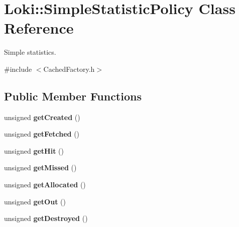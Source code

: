 \hypertarget{classLoki_1_1SimpleStatisticPolicy}{}\section{Loki\+:\+:Simple\+Statistic\+Policy Class Reference}
\label{classLoki_1_1SimpleStatisticPolicy}


Simple statistics.  




{\ttfamily \#include $<$Cached\+Factory.\+h$>$}

\subsection*{Public Member Functions}
\begin{DoxyCompactItemize}
\item 
\hypertarget{classLoki_1_1SimpleStatisticPolicy_a1ea0f0aa571233e43d9f22f576e63fd3}{}unsigned {\bfseries get\+Created} ()\label{classLoki_1_1SimpleStatisticPolicy_a1ea0f0aa571233e43d9f22f576e63fd3}

\item 
\hypertarget{classLoki_1_1SimpleStatisticPolicy_ac1d8f7952cea512cac935f3f0ce8d43d}{}unsigned {\bfseries get\+Fetched} ()\label{classLoki_1_1SimpleStatisticPolicy_ac1d8f7952cea512cac935f3f0ce8d43d}

\item 
\hypertarget{classLoki_1_1SimpleStatisticPolicy_a8708f093b7c911f49de902f7f49c01c4}{}unsigned {\bfseries get\+Hit} ()\label{classLoki_1_1SimpleStatisticPolicy_a8708f093b7c911f49de902f7f49c01c4}

\item 
\hypertarget{classLoki_1_1SimpleStatisticPolicy_a4804bfa6db149775f236c45b30e6d6d7}{}unsigned {\bfseries get\+Missed} ()\label{classLoki_1_1SimpleStatisticPolicy_a4804bfa6db149775f236c45b30e6d6d7}

\item 
\hypertarget{classLoki_1_1SimpleStatisticPolicy_afe176bd54c304b39200881f11b331a4d}{}unsigned {\bfseries get\+Allocated} ()\label{classLoki_1_1SimpleStatisticPolicy_afe176bd54c304b39200881f11b331a4d}

\item 
\hypertarget{classLoki_1_1SimpleStatisticPolicy_a4e7cc331fccc09876750ad5438732a96}{}unsigned {\bfseries get\+Out} ()\label{classLoki_1_1SimpleStatisticPolicy_a4e7cc331fccc09876750ad5438732a96}

\item 
\hypertarget{classLoki_1_1SimpleStatisticPolicy_a96f4dbe91505b67e473e305cedbd18f6}{}unsigned {\bfseries get\+Destroyed} ()\label{classLoki_1_1SimpleStatisticPolicy_a96f4dbe91505b67e473e305cedbd18f6}

\end{DoxyCompactItemize}
